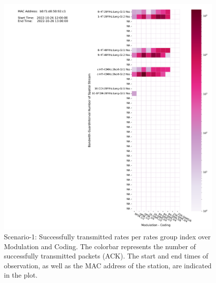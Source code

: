 \begin{figure}[hbt!]
  \centering
  \includegraphics[width=\textwidth]{figures/plots/Scenario-1/G1-heatmap-b0:f1:d8:50:92:c1-22-1652-351697.png}
  \caption[Rate-Based Packet Success Analysis]{Scenario-1: Successfully transmitted rates per rates group index over Modulation and Coding. The colorbar represents the number of successfully transmitted packets (ACK). The start and end times of observation, as well as the MAC address of the station, are indicated in the plot.}
  \label{fig:Success-count1}
\end{figure}
\FloatBarrier 


